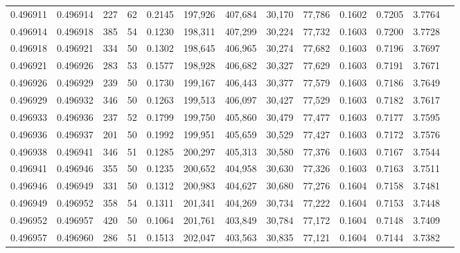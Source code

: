 \begin{tabular}{rrrrrrrrrrrrr}
0.496911 & 0.496914 & 227 &  62 &                                     0.2145 & 197,926 & 407,684 &  30,170 &  77,786 & 0.1602 & 0.7205 & 3.7764 \\
0.496914 & 0.496918 & 385 &  54 &                                     0.1230 & 198,311 & 407,299 &  30,224 &  77,732 & 0.1603 & 0.7200 & 3.7728 \\
0.496918 & 0.496921 & 334 &  50 &                                     0.1302 & 198,645 & 406,965 &  30,274 &  77,682 & 0.1603 & 0.7196 & 3.7697 \\
0.496921 & 0.496926 & 283 &  53 &                                     0.1577 & 198,928 & 406,682 &  30,327 &  77,629 & 0.1603 & 0.7191 & 3.7671 \\
0.496926 & 0.496929 & 239 &  50 &                                     0.1730 & 199,167 & 406,443 &  30,377 &  77,579 & 0.1603 & 0.7186 & 3.7649 \\
0.496929 & 0.496932 & 346 &  50 &                                     0.1263 & 199,513 & 406,097 &  30,427 &  77,529 & 0.1603 & 0.7182 & 3.7617 \\
0.496933 & 0.496936 & 237 &  52 &                                     0.1799 & 199,750 & 405,860 &  30,479 &  77,477 & 0.1603 & 0.7177 & 3.7595 \\
0.496936 & 0.496937 & 201 &  50 &                                     0.1992 & 199,951 & 405,659 &  30,529 &  77,427 & 0.1603 & 0.7172 & 3.7576 \\
0.496938 & 0.496941 & 346 &  51 &                                     0.1285 & 200,297 & 405,313 &  30,580 &  77,376 & 0.1603 & 0.7167 & 3.7544 \\
0.496941 & 0.496946 & 355 &  50 &                                     0.1235 & 200,652 & 404,958 &  30,630 &  77,326 & 0.1603 & 0.7163 & 3.7511 \\
0.496946 & 0.496949 & 331 &  50 &                                     0.1312 & 200,983 & 404,627 &  30,680 &  77,276 & 0.1604 & 0.7158 & 3.7481 \\
0.496949 & 0.496952 & 358 &  54 &                                     0.1311 & 201,341 & 404,269 &  30,734 &  77,222 & 0.1604 & 0.7153 & 3.7448 \\
0.496952 & 0.496957 & 420 &  50 &                                     0.1064 & 201,761 & 403,849 &  30,784 &  77,172 & 0.1604 & 0.7148 & 3.7409 \\
0.496957 & 0.496960 & 286 &  51 &                                     0.1513 & 202,047 & 403,563 &  30,835 &  77,121 & 0.1604 & 0.7144 & 3.7382 \\

\end{tabular}
